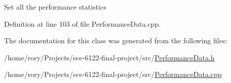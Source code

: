 Set all the performance statistics 

Definition at line 103 of file Performance\+Data.\+cpp.



The documentation for this class was generated from the following files\+:\begin{DoxyCompactItemize}
\item 
/home/rory/\+Projects/ece-\/6122-\/final-\/project/src/\hyperlink{_performance_data_8h}{Performance\+Data.\+h}\item 
/home/rory/\+Projects/ece-\/6122-\/final-\/project/src/\hyperlink{_performance_data_8cpp}{Performance\+Data.\+cpp}\end{DoxyCompactItemize}
